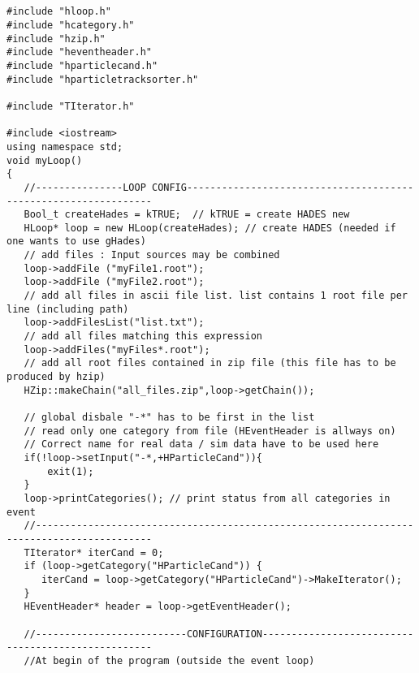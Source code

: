 \begin{lstlisting}


#include "hloop.h"
#include "hcategory.h"
#include "hzip.h"
#include "heventheader.h"
#include "hparticlecand.h"
#include "hparticletracksorter.h"

#include "TIterator.h"

#include <iostream>
using namespace std;
void myLoop()
{
   //---------------LOOP CONFIG----------------------------------------------------------------
   Bool_t createHades = kTRUE;  // kTRUE = create HADES new
   HLoop* loop = new HLoop(createHades); // create HADES (needed if one wants to use gHades)
   // add files : Input sources may be combined
   loop->addFile ("myFile1.root");
   loop->addFile ("myFile2.root"); 
   // add all files in ascii file list. list contains 1 root file per line (including path)
   loop->addFilesList("list.txt");  
   // add all files matching this expression
   loop->addFiles("myFiles*.root"); 
   // add all root files contained in zip file (this file has to be produced by hzip)
   HZip::makeChain("all_files.zip",loop->getChain()); 

   // global disbale "-*" has to be first in the list
   // read only one category from file (HEventHeader is allways on)
   // Correct name for real data / sim data have to be used here
   if(!loop->setInput("-*,+HParticleCand")){
       exit(1);                             
   }
   loop->printCategories(); // print status from all categories in event
   //------------------------------------------------------------------------------------------
   TIterator* iterCand = 0;
   if (loop->getCategory("HParticleCand")) {
      iterCand = loop->getCategory("HParticleCand")->MakeIterator();
   }
   HEventHeader* header = loop->getEventHeader();

   //--------------------------CONFIGURATION---------------------------------------------------
   //At begin of the program (outside the event loop)


\end{lstlisting}
